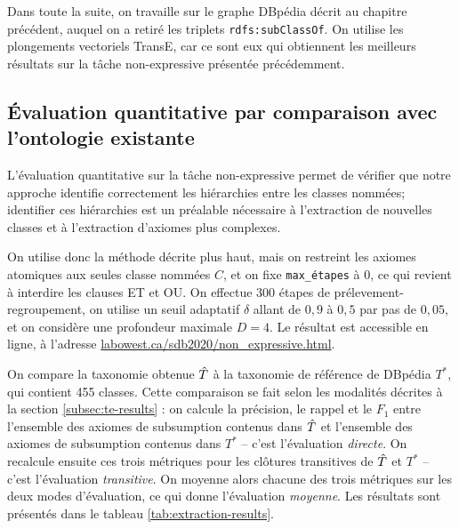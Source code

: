 Dans toute la suite, on travaille sur le graphe DBpédia décrit au chapitre précédent, auquel on a retiré les triplets \texttt{rdfs:subClassOf}. %
On utilise les plongements vectoriels TransE, car ce sont eux qui obtiennent les meilleurs résultats sur la tâche non-expressive présentée précédemment.



\subsection{Évaluation quantitative par comparaison avec l'ontologie existante}
\label{subsec:texp-reslts-quant}

L'évaluation quantitative sur la tâche non-expressive permet de vérifier que notre approche identifie correctement les hiérarchies entre les classes nommées; identifier ces hiérarchies est un préalable nécessaire à l'extraction de nouvelles classes et à l'extraction d'axiomes plus complexes.

On utilise donc la méthode décrite plus haut, mais on restreint les axiomes atomiques aux seules classe nommées $C$, et on fixe \texttt{max\_étapes} à $0$, ce qui revient à interdire les clauses ET et OU. On effectue 300 étapes de prélevement-regroupement, on utilise un seuil adaptatif $\delta$ allant de $0,9$ à $0,5$ par pas de $0,05$, et on considère une profondeur maximale $D=4$. Le résultat est accessible en ligne, à l'adresse \href{http://labowest.ca/sdb2020/non_expressive.html}{labowest.ca/sdb2020/non\_expressive.html}.

On compare la taxonomie obtenue $\hat{T}$ à la taxonomie de référence de DBpédia $T^*$, qui contient 455 classes. Cette comparaison se fait selon les modalités décrites à la section \ref{subsec:te-results} : on calcule la précision, le rappel et le $F_1$ entre l'ensemble des axiomes de subsumption contenus dans $\hat{T}$ et l'ensemble des axiomes de subsumption contenus dans $T^*$ – c'est l'évaluation \textit{directe}. On recalcule ensuite ces trois métriques pour les clôtures transitives de $\hat{T}$ et $T^*$ – c'est l'évaluation \textit{transitive}. On moyenne alors chacune des trois métriques sur les deux modes d'évaluation, ce qui donne l'évaluation \textit{moyenne}. Les résultats sont présentés dans le tableau \ref{tab:extraction-results}.

